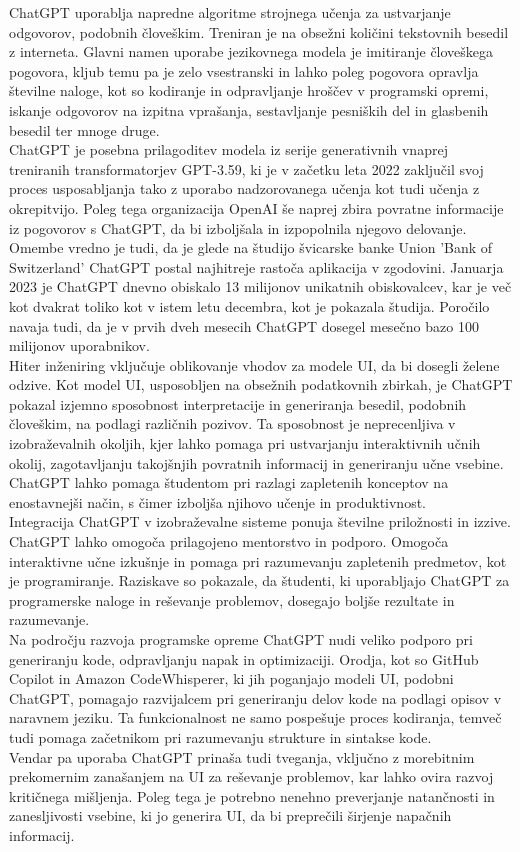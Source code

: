 \documentclass[a4paper,12pt,openright]{book}
\begin{document}
ChatGPT uporablja napredne algoritme strojnega učenja za ustvarjanje odgovorov, podobnih človeškim. Treniran je na obsežni količini tekstovnih besedil z interneta. Glavni namen uporabe jezikovnega modela je imitiranje človeškega pogovora, kljub temu pa je zelo vsestranski in lahko poleg pogovora opravlja številne naloge, kot so kodiranje in odpravljanje hroščev v programski opremi, iskanje odgovorov na izpitna vprašanja, sestavljanje pesniških del in glasbenih besedil ter mnoge druge. \cite{tung2023chatgpt} \\
ChatGPT je posebna prilagoditev modela iz serije generativnih vnaprej treniranih transformatorjev GPT-3.59, ki je v začetku leta 2022 zaključil svoj proces usposabljanja tako z uporabo nadzorovanega učenja kot tudi učenja z okrepitvijo. Poleg tega organizacija OpenAI še naprej zbira povratne informacije iz pogovorov s ChatGPT, da bi izboljšala in izpopolnila njegovo delovanje. Omembe vredno je tudi, da je glede na študijo švicarske banke Union 'Bank of Switzerland' ChatGPT postal najhitreje rastoča aplikacija v zgodovini. Januarja 2023 je ChatGPT dnevno obiskalo 13 milijonov unikatnih obiskovalcev, kar je več kot dvakrat toliko kot v istem letu decembra, kot je pokazala študija. Poročilo navaja tudi, da je v prvih dveh mesecih ChatGPT dosegel mesečno bazo 100 milijonov uporabnikov. \cite{yetistiren2023evaluating} \\

Hiter inženiring vključuje oblikovanje vhodov za modele UI, da bi dosegli želene odzive. Kot model UI, usposobljen na obsežnih podatkovnih zbirkah, je ChatGPT pokazal izjemno sposobnost interpretacije in generiranja besedil, podobnih človeškim, na podlagi različnih pozivov. Ta sposobnost je neprecenljiva v izobraževalnih okoljih, kjer lahko pomaga pri ustvarjanju interaktivnih učnih okolij, zagotavljanju takojšnjih povratnih informacij in generiranju učne vsebine. ChatGPT lahko pomaga študentom pri razlagi zapletenih konceptov na enostavnejši način, s čimer izboljša njihovo učenje in produktivnost. \\
Integracija ChatGPT v izobraževalne sisteme ponuja številne priložnosti in izzive. ChatGPT lahko omogoča prilagojeno mentorstvo in podporo. Omogoča interaktivne učne izkušnje in pomaga pri razumevanju zapletenih predmetov, kot je programiranje. Raziskave so pokazale, da študenti, ki uporabljajo ChatGPT za programerske naloge in reševanje problemov, dosegajo boljše rezultate in razumevanje. \\
Na področju razvoja programske opreme ChatGPT nudi veliko podporo pri generiranju kode, odpravljanju napak in optimizaciji. Orodja, kot so GitHub Copilot in Amazon CodeWhisperer, ki jih poganjajo modeli UI, podobni ChatGPT, pomagajo razvijalcem pri generiranju delov kode na podlagi opisov v naravnem jeziku. Ta funkcionalnost ne samo pospešuje proces kodiranja, temveč tudi pomaga začetnikom pri razumevanju strukture in sintakse kode.
 \\
Vendar pa uporaba ChatGPT prinaša tudi tveganja, vključno z morebitnim prekomernim zanašanjem na UI za reševanje problemov, kar lahko ovira razvoj kritičnega mišljenja. Poleg tega je potrebno nenehno preverjanje natančnosti in zanesljivosti vsebine, ki jo generira UI, da bi preprečili širjenje napačnih informacij. \cite{app13095783}
\end{document}
